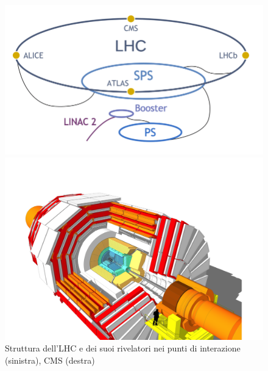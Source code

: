 \begin{figure}[t]
  \centering
  \begin{minipage}[b]{0.43\textwidth}
      \centering
      \includegraphics[width=\textwidth]{../ImmaginiTesi/LHC.png} 
  \end{minipage}
  \hfill 
  \begin{minipage}[b]{0.56\textwidth}
      \centering
      \includegraphics[width=\textwidth]{../ImmaginiTesi/CMS.png} 
  \end{minipage}
  \caption{Struttura dell'LHC e dei suoi rivelatori nei punti di interazione (sinistra), CMS (destra)}
  \label{fig:LHC-CMS}
\end{figure}


